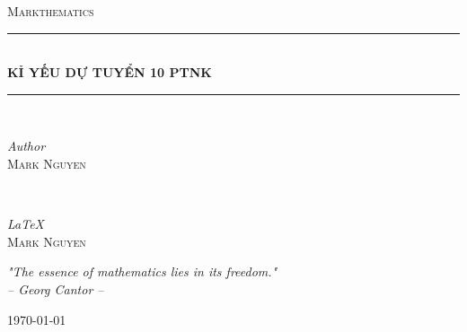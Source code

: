 \begin{titlepage}

    \newcommand{\HRule}{\rule{\linewidth}{0.5mm}} 
    \center
    
    
    \textsc{\LARGE Markthematics}\\[5cm]
    
    
    \HRule\\[0.4cm]
    
    {\huge\bfseries KỈ YẾU DỰ TUYỂN 10 PTNK}\\[0.1cm]
    
    \HRule\\[1.5cm]
    
    
    \begin{minipage}{0.4\textwidth}
        \begin{flushleft}
            \large
            \textit{Author}\\
            \textsc{Mark Nguyen}
        \end{flushleft}
    \end{minipage}
    ~
    \begin{minipage}{0.4\textwidth}
        \begin{flushright}
            \large
            \textit{\LaTeX}\\
            \textsc{Mark Nguyen}
        \end{flushright}
    \end{minipage}
    

    \vfill\vfill

    \textit{"The essence of mathematics lies in its freedom."}\\[0.25cm]
    \textit{-- Georg Cantor --}
    
    
    \vfill\vfill\vfill
    {\large\today}

    \vfill
    
\end{titlepage}